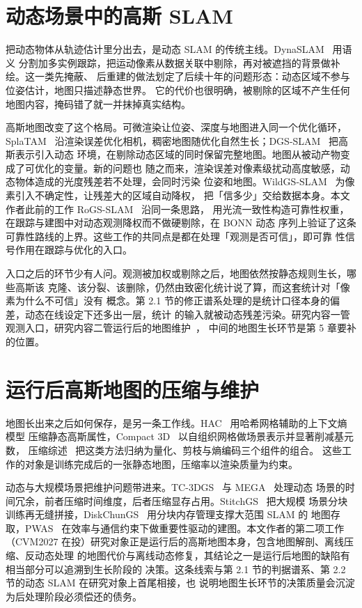 \section{动态场景中的高斯 SLAM}
\label{sec:related-gs-slam}

把动态物体从轨迹估计里分出去，是动态 SLAM 的传统主线。DynaSLAM~\cite{DynaSLAM} 用语义
分割加多实例跟踪，把运动像素从数据关联中剔除，再对被遮挡的背景做补绘。这一类先掩蔽、
后重建的做法划定了后续十年的问题形态：动态区域不参与位姿估计，地图只描述静态世界。
它的代价也很明确，被剔除的区域不产生任何地图内容，掩码错了就一并抹掉真实结构。

高斯地图改变了这个格局。可微渲染让位姿、深度与地图进入同一个优化循环，SplaTAM~\cite{SplaTAM}
沿渲染误差优化相机，稠密地图随优化自然生长；DGS-SLAM~\cite{DGSSlam} 把高斯表示引入动态
环境，在剔除动态区域的同时保留完整地图。地图从被动产物变成了可优化的变量。新的问题也
随之而来，渲染误差对像素级扰动高度敏感，动态物体造成的光度残差若不处理，会同时污染
位姿和地图。WildGS-SLAM~\cite{wildgsslam} 为像素引入不确定性，让残差大的区域自动降权，
把「信多少」交给数据本身。本文作者此前的工作 RoGS-SLAM~\cite{RoGSSLAM} 沿同一条思路，
用光流一致性构造可靠性权重，在跟踪与建图中对动态观测降权而不做硬剔除，在 BONN 动态
序列上验证了这条可靠性路线的上界。这些工作的共同点是都在处理「观测是否可信」，即可靠
性信号作用在跟踪与优化的入口。

入口之后的环节少有人问。观测被加权或剔除之后，地图依然按静态规则生长，哪些高斯该
克隆、该分裂、该删除，仍然由致密化统计说了算，而这套统计对「像素为什么不可信」没有
概念。第 2.1 节的修正谱系处理的是统计口径本身的偏差，动态在线设定下还多出一层，统计
的输入就被动态残差污染。研究内容一管观测入口，研究内容二管运行后的地图维护~\cite{CompressionSurvey}，
中间的地图生长环节是第 5 章要补的位置。

\section{运行后高斯地图的压缩与维护}
\label{sec:related-compression}

地图长出来之后如何保存，是另一条工作线。HAC~\cite{HAC} 用哈希网格辅助的上下文熵模型
压缩静态高斯属性，Compact 3D~\cite{Compact3D} 以自组织网格做场景表示并显著削减基元数，
压缩综述~\cite{CompressionSurvey} 把这类方法归纳为量化、剪枝与熵编码三个组件的组合。
这些工作的对象是训练完成后的一张静态地图，压缩率以渲染质量为约束。

动态与大规模场景把维护问题带进来。TC-3DGS~\cite{TC3DGS} 与 MEGA~\cite{MEGA} 处理动态
场景的时间冗余，前者压缩时间维度，后者压缩显存占用。StitchGS~\cite{StitchGS} 把大规模
场景分块训练再无缝拼接，DiskChunGS~\cite{DiskChunGS} 用分块内存管理支撑大范围 SLAM 的
地图存取，PWAS~\cite{PWAS} 在效率与通信约束下做重要性驱动的建图。本文作者的第二项工作
（CVM2027 在投）研究对象正是运行后的高斯地图本身，包含地图解剖、离线压缩、反动态处理
的地图代价与离线动态修复，其结论之一是运行后地图的缺陷有相当部分可以追溯到生长阶段的
决策。这条线索与第 2.1 节的判据谱系、第 2.2 节的动态 SLAM 在研究对象上首尾相接，也
说明地图生长环节的决策质量会沉淀为后处理阶段必须偿还的债务。
